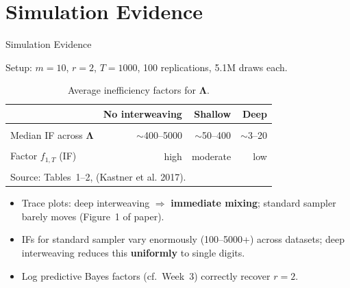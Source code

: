\documentclass[10pt]{beamer}\usepackage[]{graphicx}\usepackage[table]{xcolor}
\begin{document}

\section{Simulation Evidence}

\begin{frame}{Simulation Evidence}

  Setup: $m=10$, $r=2$, $T=1000$, 100 replications, 5.1M draws each.

  \vspace{0.3em}

  \begin{table}[!h]
    \centering
    \fontsize{8pt}{10pt}\selectfont
    \begin{tabular}{lrrr}
      \toprule
      & \textbf{No interweaving} & \textbf{Shallow} & \textbf{Deep} \\
      \midrule
      \cellcolor{gray!10}{$\lambda_{11}$ (avg.\ IF)}
        & \cellcolor{gray!10}{$>1000$}
        & \cellcolor{gray!10}{$\approx 200$}
        & \cellcolor{gray!10}{$\approx 5$} \\
      Median IF across $\boldsymbol{\Lambda}$
        & $\sim$400--5000 & $\sim$50--400 & $\sim$3--20 \\
      \cellcolor{gray!10}{Efficiency gain}
        & \cellcolor{gray!10}{---}
        & \cellcolor{gray!10}{$2$--$8\times$}
        & \cellcolor{gray!10}{up to $\mathbf{400\times}$} \\
      Factor $f_{1,T}$ (IF) & high & moderate & low \\
      \cellcolor{gray!10}{Factor log-var $h_{m+1,T}$ (IF)}
        & \cellcolor{gray!10}{high}
        & \cellcolor{gray!10}{high}
        & \cellcolor{gray!10}{substantially reduced} \\
      \bottomrule
      \multicolumn{4}{l}{\scriptsize Source: Tables~1--2, (Kastner et al. 2017).}
    \end{tabular}
    \captionsetup{font=tiny}
    \caption{Average inefficiency factors for $\boldsymbol{\Lambda}$.}
  \end{table}

  \begin{itemize}
    \setlength\itemsep{0.3em}
    \item Trace plots: deep interweaving $\Rightarrow$ \textbf{immediate mixing};
    standard sampler barely moves (Figure~1 of paper).
    \item IFs for standard sampler vary enormously (100--5000+) across datasets;
    deep interweaving reduces this \textbf{uniformly} to single digits.
    \item Log predictive Bayes factors (cf.\ Week~3) correctly recover $r=2$.
  \end{itemize}

\end{frame}
\end{document}
